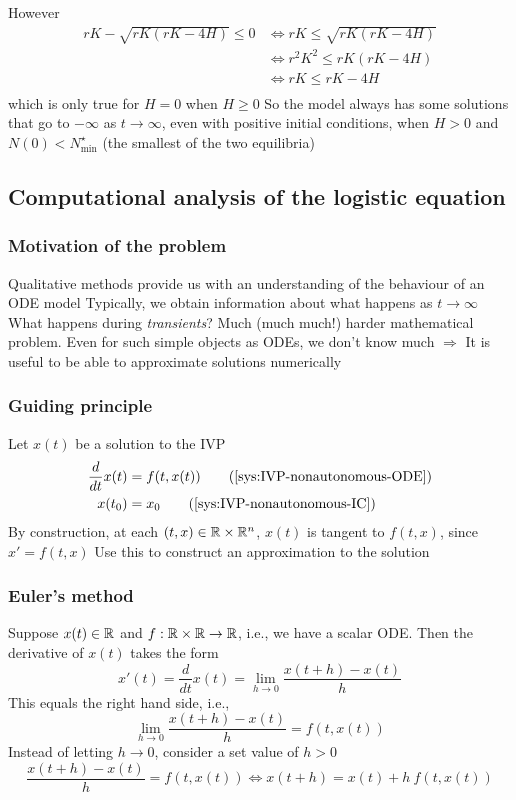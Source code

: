 \documentclass[aspectratio=169]{beamer}
\begin{document}
\begin{frame}
However
\begin{align*}
rK-\sqrt{rK(rK-4H)}\leq 0 &\iff rK\leq \sqrt{rK(rK-4H)}\\
&\iff r^2K^2\leq rK(rK-4H)\\
&\iff rK\leq rK-4H\\
\end{align*}
which is only true for $H=0$ when $H\geq 0$
\vfill
So the model always has some solutions that go to $-\infty$ as $t\to\infty$, even with positive initial conditions, when $H>0$ and $N(0)<N^\star_{\text{min}}$ (the smallest of the two equilibria)
\end{frame}

\subsection{Computational analysis of the logistic equation}

\begin{frame}\frametitle{Motivation of the problem}
Qualitative methods provide us with an understanding of the behaviour of an ODE model
\vfill
Typically, we obtain information about what happens as $t\to\infty$
\vfill
What happens during \emph{transients}? Much (much much!) harder mathematical problem. Even for such simple objects as ODEs, we don't know much
\vfill
$\Rightarrow$ It is useful to be able to approximate solutions numerically
\end{frame}


\begin{frame}\frametitle{Guiding principle}
Let $x(t)$ be a solution to the IVP
\begin{subequations}
\begin{align}
\frac{d}{dt}x(t) &= f(t,x(t)) 
\tag{\ref{sys:IVP-nonautonomous-ODE}}\\
x(t_0) &= x_0
\tag{\ref{sys:IVP-nonautonomous-IC}}
\end{align}
\end{subequations}
\vfill
By construction, at each $(t,x)\in\mathbb{R}\times\mathbb{R}^n$, $x(t)$ is tangent to $f(t,x)$, since $x'=f(t,x)$
\vfill
Use this to construct an approximation to the solution
\end{frame}

\begin{frame}\frametitle{Euler's method}
Suppose $x(t)\in\mathbb{R}$ and $f:\mathbb{R}\times\mathbb{R}\to\mathbb{R}$, i.e., we have a scalar ODE. Then the derivative of $x(t)$ takes the form
\vfill
\[
x'(t)=\frac{d}{dt}x(t) = \lim_{h\to 0}\frac{x(t+h)-x(t)}{h}
\]
\vfill
This equals the right hand side, i.e.,
\[
\lim_{h\to 0}\frac{x(t+h)-x(t)}{h} = f(t,x(t))
\]
\vfill
Instead of letting $h\to 0$, consider a set value of $h>0$
\[
\frac{x(t+h)-x(t)}{h} = f(t,x(t)) \iff
x(t+h) = x(t) + h\ f(t,x(t))
\]
\end{frame}
\end{document}
